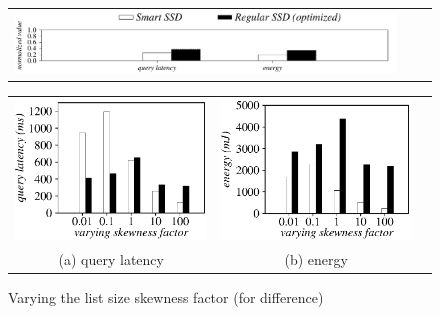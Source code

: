 
\begin{figure}[tbp]
  \centering
    \begin{tabular}{ccc}
 \includegraphics[width=0.52\columnwidth]{figures/banner2.pdf}%
\end{tabular}
\vspace{-0.1cm}
\renewcommand{\tabcolsep}{0.1mm}


  \begin{tabular}{ccc}
 \includegraphics[width=0.5\columnwidth]{figures/Difference-time-VaryListSkew.eps}&
  \includegraphics[width=0.5\columnwidth]{figures/Difference-energy-VaryListSkew.eps}\\
  (a) query latency & (b) energy
\end{tabular}

  \caption{Varying the list size skewness factor (for difference)}
  \label{fig:varyListSkewDifference}
 \end{figure}


